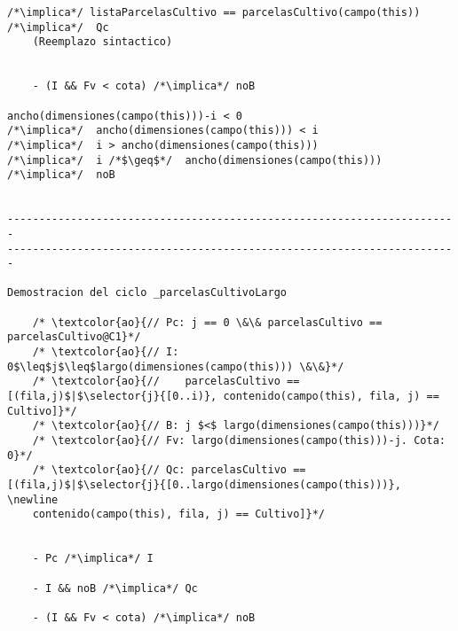 \begin{lstlisting}
/*\implica*/ listaParcelasCultivo == parcelasCultivo(campo(this))  /*\implica*/  Qc
	(Reemplazo sintactico)
	
	
    - (I && Fv < cota) /*\implica*/ noB
    
ancho(dimensiones(campo(this)))-i < 0
/*\implica*/  ancho(dimensiones(campo(this))) < i
/*\implica*/  i > ancho(dimensiones(campo(this)))
/*\implica*/  i /*$\geq$*/  ancho(dimensiones(campo(this))) /*\implica*/  noB

	
-----------------------------------------------------------------------
-----------------------------------------------------------------------

Demostracion del ciclo _parcelasCultivoLargo

    /* \textcolor{ao}{// Pc: j == 0 \&\& parcelasCultivo == parcelasCultivo@C1}*/      
    /* \textcolor{ao}{// I: 0$\leq$j$\leq$largo(dimensiones(campo(this))) \&\&}*/        
    /* \textcolor{ao}{//    parcelasCultivo == [(fila,j)$|$\selector{j}{[0..i)}, contenido(campo(this), fila, j) == Cultivo]}*/ 
    /* \textcolor{ao}{// B: j $<$ largo(dimensiones(campo(this)))}*/   
	/* \textcolor{ao}{// Fv: largo(dimensiones(campo(this)))-j. Cota: 0}*/     
    /* \textcolor{ao}{// Qc: parcelasCultivo == [(fila,j)$|$\selector{j}{[0..largo(dimensiones(campo(this)))}, \newline
    contenido(campo(this), fila, j) == Cultivo]}*/      


    - Pc /*\implica*/ I

    - I && noB /*\implica*/ Qc

    - (I && Fv < cota) /*\implica*/ noB
    

\end{lstlisting}


